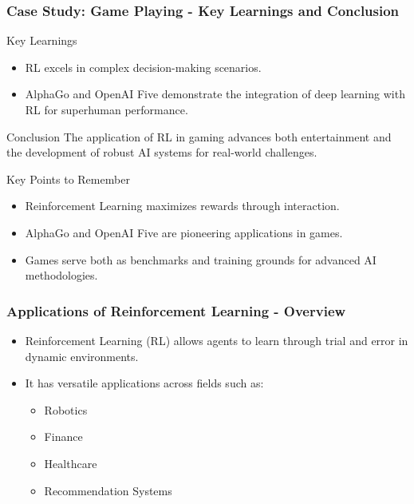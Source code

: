 \documentclass[aspectratio=169]{beamer}
\begin{document}
\begin{frame}[fragile]
    \frametitle{Case Study: Game Playing - Key Learnings and Conclusion}
    \begin{block}{Key Learnings}
        \begin{itemize}
            \item RL excels in complex decision-making scenarios.
            \item AlphaGo and OpenAI Five demonstrate the integration of deep learning with RL for superhuman performance.
        \end{itemize}
    \end{block}
    
    \begin{block}{Conclusion}
        The application of RL in gaming advances both entertainment and the development of robust AI systems for real-world challenges.
    \end{block}
    
    \begin{block}{Key Points to Remember}
        \begin{itemize}
            \item Reinforcement Learning maximizes rewards through interaction.
            \item AlphaGo and OpenAI Five are pioneering applications in games.
            \item Games serve both as benchmarks and training grounds for advanced AI methodologies.
        \end{itemize}
    \end{block}
\end{frame}

\begin{frame}[fragile]
    \frametitle{Applications of Reinforcement Learning - Overview}
    \begin{itemize}
        \item Reinforcement Learning (RL) allows agents to learn through trial and error in dynamic environments.
        \item It has versatile applications across fields such as:
        \begin{itemize}
            \item Robotics
            \item Finance
            \item Healthcare
            \item Recommendation Systems
        \end{itemize}
    \end{itemize}
\end{frame}
\end{document}
